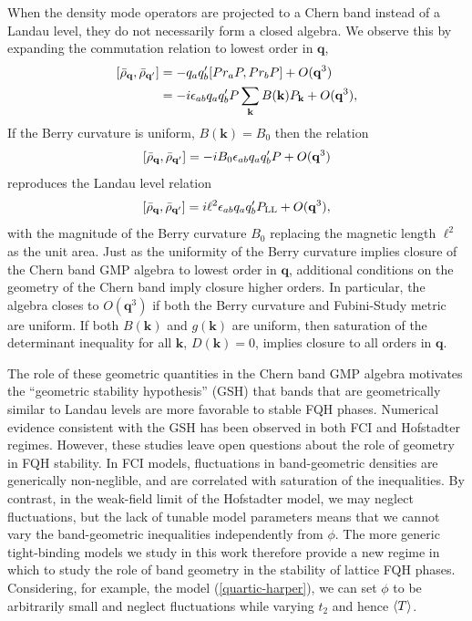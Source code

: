 \documentclass[aps,prb,twocolumn,letterpaper,twoside,nobalancelastpage,groupedaddress,amsmath,amssymb,floatfix,citeautoscript]{revtex4-1}
\begin{document}
When the density mode operators are projected to a Chern band instead of a Landau level, they do not necessarily form a closed algebra\cite{parameswaran_fractional_2012}. We observe this by expanding the commutation relation to lowest order in $\mathbf{q}$,
\begin{align*}
\comm{\bar{\rho}_{\mathbf{q}}}{\bar{\rho}_{\mathbf{q}'}} &= -q_a q'_b \comm{Pr_aP}{Pr_bP} + O(\mathbf{q}^3)\\
&= - i \epsilon_{ab} q_a q'_b P \sum_{\mathbf{k}} B(\mathbf{k}) P_\mathbf{k} + O(\mathbf{q}^3),
\end{align*}
If the Berry curvature is uniform, $B(\mathbf{k}) = B_0$ then the relation
\begin{align*}
\comm{\bar{\rho}_{\mathbf{q}}}{\bar{\rho}_{\mathbf{q}'}} = - i B_0\epsilon_{ab} q_a q'_b P + O(\mathbf{q}^3)
\end{align*}
reproduces the Landau level relation
\begin{align*}
\comm{\bar{\rho}_{\mathbf{q}}}{\bar{\rho}_{\mathbf{q}'}} = i \ell^2 \epsilon_{ab} q_a q'_b P_{\text{LL}} + O(\mathbf{q}^3),
\end{align*}
with the magnitude of the Berry curvature $B_0$ replacing the magnetic length $\ell^2$ as the unit area. Just as the uniformity of the Berry curvature implies closure of the Chern band GMP algebra to lowest order in $\mathbf{q}$, additional conditions on the geometry of the Chern band imply closure higher orders.\cite{roy_band_2014} In particular, the algebra closes to $O(\mathbf{q}^3)$ if both the Berry curvature and Fubini-Study metric are uniform. If both $B(\mathbf{k})$ and $g(\mathbf{k})$ are uniform, then saturation of the determinant inequality for all $\mathbf{k}$, $D(\mathbf{k}) = 0$, implies closure to all orders in $\mathbf{q}$.

The role of these geometric quantities in the Chern band GMP algebra motivates the ``geometric stability hypothesis'' (GSH)\cite{roy_band_2014,jackson_geometric_2015} that bands that are geometrically similar to Landau levels are more favorable to stable FQH phases. Numerical evidence consistent with the GSH has been observed in both FCI \cite{jackson_geometric_2015} and Hofstadter regimes\cite{bauer_quantum_2016}. However, these studies leave open questions about the role of geometry in FQH stability. In FCI models, fluctuations in band-geometric densities are generically non-neglible, and are correlated with saturation of the inequalities. By contrast, in the weak-field limit of the Hofstadter model, we may neglect fluctuations, but the lack of tunable model parameters means that we cannot vary the band-geometric inequalities independently from $\phi$. The more generic tight-binding models we study in this work therefore provide a new regime in which to study the role of band geometry in the stability of lattice FQH phases. Considering, for example, the model (\ref{quartic-harper}), we can set $\phi$ to be arbitrarily small and neglect fluctuations while varying $t_2$ and hence $\expval{T}$.
\end{document}
